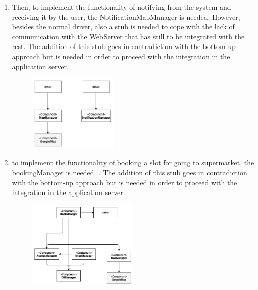 \begin{enumerate}
\item Then, to implement the functionality of notifying from the system and receiving it by the user, the NotificationMapManager is needed. However, besides the normal driver, also a stub is needed to cope with the lack of communication with the WebServer that has still to be integrated with the rest. The addition of this stub goes in contradiction with the bottom-up approach but is needed in order to proceed with the integration in the application server.\\
\begin{figure}[H]
  \centering
  \includegraphics[width=0.4\textwidth,keepaspectratio]{images/IS/IS3.png}
\end{figure}

\item to implement the functionality of booking a slot for going to supermarket, the bookingManager is needed. . The addition of this stub goes in contradiction with the bottom-up approach but is needed in order to proceed with the integration in the application server.\\
\begin{figure}[H]
  \centering
  \includegraphics[width=0.5\textwidth,keepaspectratio]{images/IS/IS4.png}
\end{figure}


\end{enumerate}
